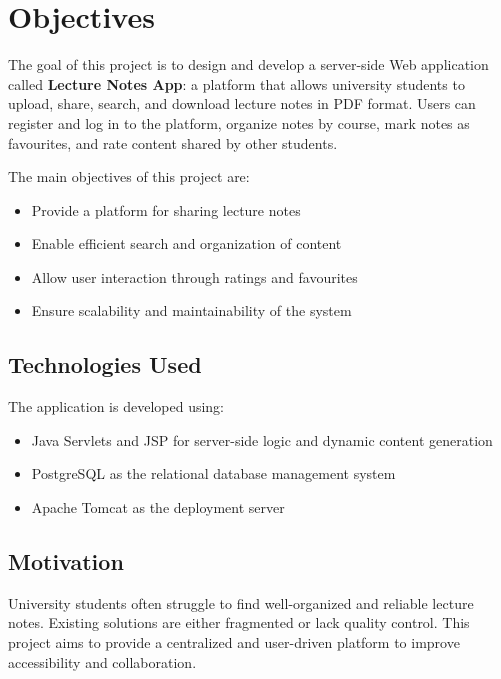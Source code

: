 \section{Objectives}
The goal of this project is to design and develop a server-side Web application called
\textbf{Lecture Notes App}: a platform that allows university students to upload, share,
search, and download lecture notes in PDF format.
Users can register and log in to the platform, organize notes by course, mark notes
as favourites, and rate content shared by other students.

The main objectives of this project are:
\begin{itemize}
    \item Provide a platform for sharing lecture notes
    \item Enable efficient search and organization of content
    \item Allow user interaction through ratings and favourites
    \item Ensure scalability and maintainability of the system
\end{itemize}

\subsection{Technologies Used}

The application is developed using:
\begin{itemize}
    \item Java Servlets and JSP for server-side logic and dynamic content generation
    \item PostgreSQL as the relational database management system
    \item Apache Tomcat as the deployment server
\end{itemize}

\subsection{Motivation}

University students often struggle to find well-organized and reliable lecture notes.
Existing solutions are either fragmented or lack quality control. This project aims to
provide a centralized and user-driven platform to improve accessibility and collaboration.